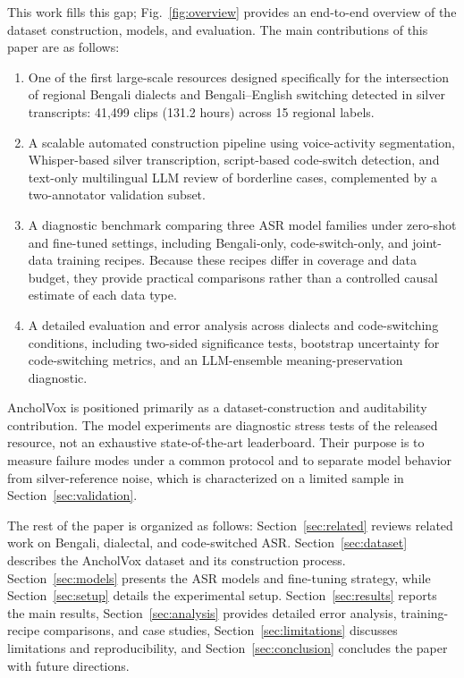 \documentclass[journal]{IEEEtran}
\begin{document}
This work fills this gap; Fig.~\ref{fig:overview} provides an end-to-end overview of the dataset construction, models, and evaluation. The main contributions of this paper are as follows:

\begin{enumerate}[leftmargin=*]
\item One of the first large-scale resources designed specifically for the intersection of regional Bengali dialects and Bengali--English switching detected in silver transcripts: 41{,}499 clips (131.2 hours) across 15 regional labels.

\item A scalable automated construction pipeline using voice-activity segmentation, Whisper-based silver transcription, script-based code-switch detection, and text-only multilingual LLM review of borderline cases, complemented by a two-annotator validation subset.

\item A diagnostic benchmark comparing three ASR model families under zero-shot and fine-tuned settings, including Bengali-only, code-switch-only, and joint-data training recipes. Because these recipes differ in coverage and data budget, they provide practical comparisons rather than a controlled causal estimate of each data type.

\item A detailed evaluation and error analysis across dialects and code-switching conditions, including two-sided significance tests, bootstrap uncertainty for code-switching metrics, and an LLM-ensemble meaning-preservation diagnostic.
\end{enumerate}

AncholVox is positioned primarily as a dataset-construction and auditability
contribution. The model experiments are diagnostic stress tests of the released
resource, not an exhaustive state-of-the-art leaderboard. Their purpose is to
measure failure modes under a common protocol and to separate model behavior
from silver-reference noise, which is characterized on a limited sample in
Section~\ref{sec:validation}.


The rest of the paper is organized as follows: Section~\ref{sec:related} reviews related work on Bengali, dialectal, and code-switched ASR. Section~\ref{sec:dataset} describes the AncholVox dataset and its construction process. Section~\ref{sec:models} presents the ASR models and fine-tuning strategy, while Section~\ref{sec:setup} details the experimental setup. Section~\ref{sec:results} reports the main results, Section~\ref{sec:analysis} provides detailed error analysis, training-recipe comparisons, and case studies, Section~\ref{sec:limitations} discusses limitations and reproducibility, and Section~\ref{sec:conclusion} concludes the paper with future directions.
\end{document}
